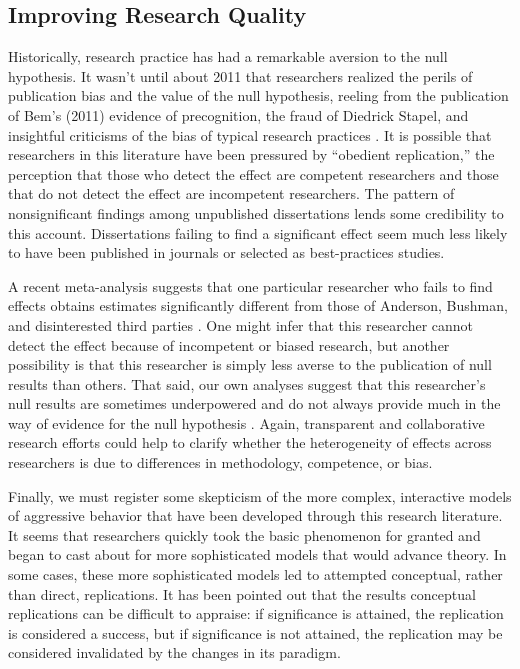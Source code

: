 \documentclass[man]{apa6}
\begin{document}
\subsection{Improving Research Quality}
Historically, research practice has had a remarkable aversion to the null hypothesis. It wasn't until about 2011 that researchers realized the perils of publication bias and the value of the null hypothesis, reeling from the publication of Bem's (2011) \nocite{Bem:2011} evidence of precognition, the fraud of Diedrick Stapel, and insightful criticisms of the bias of typical research practices \citep{Bakker:etal:2011,Ioannidis:2011,Simmons:etal:2011,Bones:20xx}. It is possible that researchers in this literature have been pressured by ``obedient replication,'' the perception that those who detect the effect are competent researchers and those that do not detect the effect are incompetent researchers. The pattern of nonsignificant findings among unpublished dissertations lends some credibility to this account. Dissertations failing to find a significant effect seem much less likely to have been published in journals or selected as best-practices studies. 

A recent meta-analysis suggests that one particular researcher who fails to find effects obtains estimates significantly different from those of Anderson, Bushman, and disinterested third parties \citep{Greitemeyer:Mugge:2014}. One might infer that this researcher cannot detect the effect because of incompetent or biased research, but another possibility is that this researcher is simply less averse to the publication of null results than others. That said, our own analyses suggest that this researcher's null results are sometimes underpowered and do not always provide much in the way of evidence for the null hypothesis \citep{Hilgard:etal:2015}. Again, transparent and collaborative research efforts could help to clarify whether the heterogeneity of effects across researchers is due to differences in methodology, competence, or bias.

Finally, we must register some skepticism of the more complex, interactive models of aggressive behavior that have been developed through this research literature. It seems that researchers quickly took the basic phenomenon for granted and began to cast about for more sophisticated models that would advance theory. In some cases, these more sophisticated models led to attempted conceptual, rather than direct, replications. It has been pointed out that the results conceptual replications can be difficult to appraise: if significance is attained, the replication is considered a success, but if significance is not attained, the replication may be considered invalidated by the changes in its paradigm. 
\end{document}
